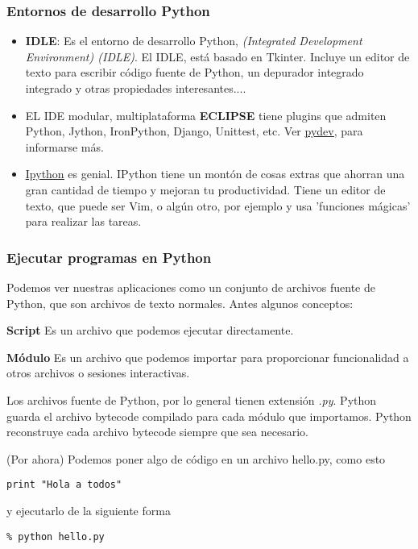 \documentclass[10pt]{beamer}
\begin{document}
\begin{frame}[fragile]
\frametitle{Entornos de desarrollo Python}

\begin{itemize}
\item \textbf{IDLE}: Es el entorno de desarrollo Python, \textit{(Integrated Development Environment) (IDLE)}. El IDLE, est\'a basado en Tkinter. Incluye un editor de texto para escribir c\'odigo fuente de Python, un depurador integrado integrado y otras propiedades interesantes....
\item EL IDE modular, multiplataforma  \textbf{ECLIPSE} tiene plugins que admiten Python, Jython, IronPython, Django, Unittest, etc. Ver \href{http://pydev.org/}{\underline{pydev}}, para informarse m\'as.

\item  \href{http://ipython.org/}{\underline{Ipython}} es genial. IPython tiene un mont\'on de cosas  extras que  ahorran  una gran cantidad de tiempo y mejoran tu  productividad. Tiene un editor de texto, que puede ser Vim, o alg\'un otro, por ejemplo y usa 'funciones m\'agicas' para realizar las tareas.
\end{itemize}
\end{frame}


\begin{frame}[fragile]
\frametitle{Ejecutar programas en Python}

\vspace{0.2cm}

Podemos ver nuestras aplicaciones como un conjunto de archivos fuente de Python, que son archivos de texto normales. Antes algunos conceptos:

\vspace{0.2cm}

\textbf{Script} Es un archivo que podemos ejecutar directamente. 

\textbf{M\'odulo} Es un archivo que podemos importar para proporcionar funcionalidad a otros archivos o sesiones interactivas.

\vspace{0.2cm}

Los archivos fuente de Python, por lo general tienen extensi\'on \textit{.py}. Python guarda el archivo bytecode compilado para cada m\'odulo que importamos. Python reconstruye cada archivo bytecode siempre que sea necesario.

\vspace{0.2cm}

(Por ahora) Podemos poner algo de c\'odigo en un archivo hello.py, como esto
  
\begin{lstlisting}
print "Hola a todos"
\end{lstlisting}
\vspace{0.2cm}

y ejecutarlo de la siguiente forma

\vspace{0.2cm}

\begin{lstlisting}
% python hello.py 
\end{lstlisting}

\end{frame}
\end{document}
